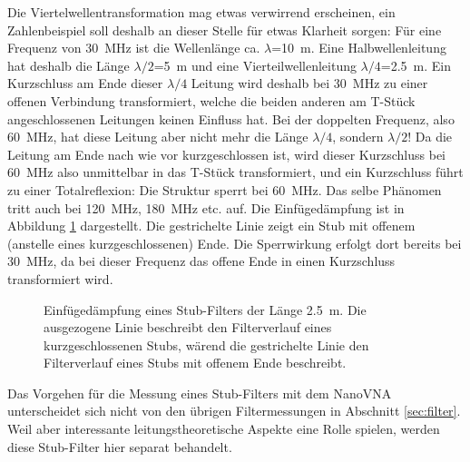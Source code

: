 \documentclass[twoside,a4paper,11pt,halfparskip,DIV=11,notitlepage]{scrartcl}
\begin{document}
Die Viertelwellentransformation mag etwas verwirrend erscheinen, ein Zahlenbeispiel
soll deshalb an dieser Stelle für etwas Klarheit sorgen: Für eine Frequenz von
30~MHz ist die Wellenlänge ca. $\lambda$=10~m. Eine Halbwellenleitung hat deshalb
die Länge $\lambda/2$=5~m und eine Vierteilwellenleitung $\lambda/4$=2.5~m. Ein
Kurzschluss am Ende dieser $\lambda/4$ Leitung wird deshalb bei 30~MHz zu einer
offenen Verbindung transformiert, welche die beiden anderen am T-Stück
angeschlossenen Leitungen keinen Einfluss hat. Bei der doppelten Frequenz, also
60~MHz, hat diese Leitung aber nicht mehr die Länge  $\lambda/4$, sondern
$\lambda/2$! Da die Leitung am Ende nach wie vor kurzgeschlossen ist, wird dieser
Kurzschluss bei 60~MHz also unmittelbar in das T-Stück transformiert, und ein
Kurzschluss führt zu einer Totalreflexion: Die Struktur sperrt bei 60~MHz. Das
selbe Phänomen tritt auch bei 120~MHz, 180~MHz etc. auf. Die Einfügedämpfung
ist in Abbildung \ref{fig:quarterwaveplot} dargestellt. Die gestrichelte Linie
zeigt ein Stub mit offenem (anstelle eines kurzgeschlossenen) Ende. Die Sperrwirkung
erfolgt dort bereits bei 30~MHz, da bei dieser Frequenz das offene Ende in einen
Kurzschluss transformiert wird.


\begin{figure}
\begin{center}
\end{center}
\caption{Einfügedämpfung eines Stub-Filters der Länge 2.5~m. Die ausgezogene Linie beschreibt den Filterverlauf
eines kurzgeschlossenen Stubs, wärend die gestrichelte Linie den Filterverlauf eines Stubs mit offenem Ende beschreibt.}
\label{fig:quarterwaveplot}
\end{figure}

Das Vorgehen für die Messung eines Stub-Filters mit dem NanoVNA unterscheidet
sich nicht von den übrigen Filtermessungen in Abschnitt \ref{sec:filter}. Weil
aber interessante leitungstheoretische Aspekte eine Rolle spielen, werden diese
Stub-Filter hier separat behandelt.
\end{document}
